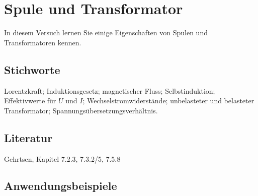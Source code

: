 \chapter{Spule und Transformator}
\label{v:16}


In diesem Versuch lernen Sie einige Eigenschaften von Spulen und Transformatoren kennen.

\section{Stichworte}

Lorentzkraft; Induktionsgesetz; magnetischer Fluss; Selbstinduktion; Effektivwerte für $U$ und $I$; Wechselstromwiderstände; unbelasteter und belasteter Transformator; Spannungsübersetzungsverhältnis.
%
\section{Literatur}

Gehrtsen, Kapitel 7.2.3, 7.3.2/5, 7.5.8
%
\section{Anwendungsbeispiele}

